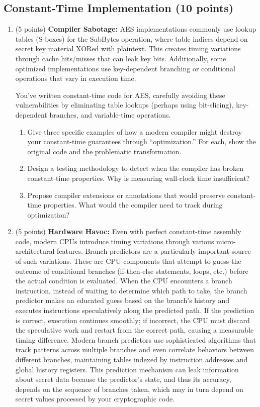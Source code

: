 \documentclass[10pt,a4paper,american]{exam}
\begin{document}
\subsection{Constant-Time Implementation (10 points)}

\begin{enumerate}
	\item (5 points) \textbf{Compiler Sabotage:}
	      AES implementations commonly use lookup tables (S-boxes) for the SubBytes operation, where table indices depend on secret key material XORed with plaintext. This creates timing variations through cache hits/misses that can leak key bits. Additionally, some optimized implementations use key-dependent branching or conditional operations that vary in execution time.

	      You've written constant-time code for AES, carefully avoiding these vulnerabilities by eliminating table lookups (perhaps using bit-slicing), key-dependent branches, and variable-time operations.
	      \begin{enumerate}
		      \item Give three specific examples of how a modern compiler might destroy your constant-time guarantees through ``optimization.'' For each, show the original code and the problematic transformation.
		      \item Design a testing methodology to detect when the compiler has broken constant-time properties. Why is measuring wall-clock time insufficient?
		      \item Propose compiler extensions or annotations that would preserve constant-time properties. What would the compiler need to track during optimization?
	      \end{enumerate}
	\item (5 points) \textbf{Hardware Havoc:}
	      Even with perfect constant-time assembly code, modern CPUs introduce timing variations through various micro-architectural features. Branch predictors are a particularly important source of such variations. These are CPU components that attempt to guess the outcome of conditional branches (if-then-else statements, loops, etc.) before the actual condition is evaluated. When the CPU encounters a branch instruction, instead of waiting to determine which path to take, the branch predictor makes an educated guess based on the branch's history and executes instructions speculatively along the predicted path. If the prediction is correct, execution continues smoothly; if incorrect, the CPU must discard the speculative work and restart from the correct path, causing a measurable timing difference. Modern branch predictors use sophisticated algorithms that track patterns across multiple branches and even correlate behaviors between different branches, maintaining tables indexed by instruction addresses and global history registers. This prediction mechanism can leak information about secret data because the predictor's state, and thus its accuracy, depends on the sequence of branches taken, which may in turn depend on secret values processed by your cryptographic code.

\end{enumerate}
\end{document}
